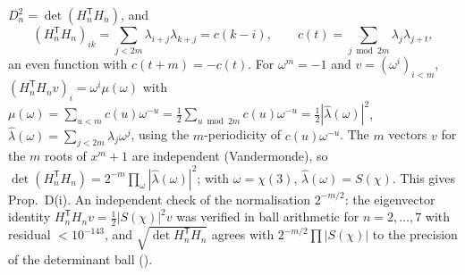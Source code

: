 $D_n^2=\det(H_n^{\mathsf T}H_n)$, and
\[ (H_n^{\mathsf T}H_n)_{ik}=\sum_{j<2m}\lambda_{i+j}\lambda_{k+j}=c(k-i),\qquad c(t)=\sum_{j\bmod 2m}\lambda_j\lambda_{j+t}, \]
an even function with $c(t+m)=-c(t)$. For $\omega^m=-1$ and $v=(\omega^i)_{i<m}$, $(H_n^{\mathsf T}H_nv)_i=\omega^i\mu(\omega)$ with $\mu(\omega)=\sum_{u<m}c(u)\omega^{-u}=\tfrac12\sum_{u\bmod2m}c(u)\omega^{-u}=\tfrac12|\hat\lambda(\omega)|^2$, $\hat\lambda(\omega)=\sum_{j<2m}\lambda_j\omega^j$, using the $m$-periodicity of $c(u)\omega^{-u}$. The $m$ vectors $v$ for the $m$ roots of $x^m+1$ are independent (Vandermonde), so $\det(H_n^{\mathsf T}H_n)=2^{-m}\prod_\omega|\hat\lambda(\omega)|^2$; with $\omega=\chi(3)$, $\hat\lambda(\omega)=S(\chi)$. This gives Prop.~D(i). An independent check of the normalisation $2^{-m/2}$: the eigenvector identity $H_n^{\mathsf T}H_nv=\tfrac12|S(\chi)|^2v$ was verified in ball arithmetic for $n=2,\dots,7$ with residual $<10^{-143}$, and $\sqrt{\det H_n^{\mathsf T}H_n}$ agrees with $2^{-m/2}\prod|S(\chi)|$ to the precision of the determinant ball ().
